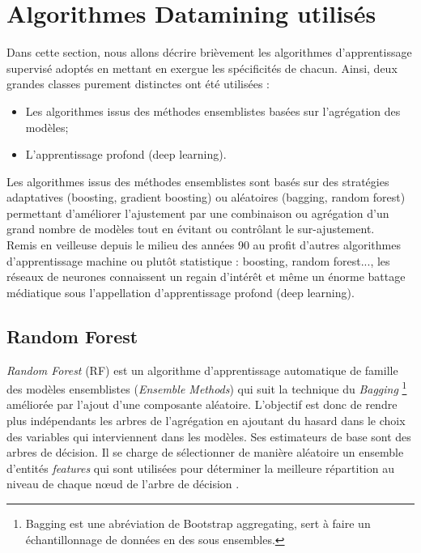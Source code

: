 \newpage
\section{Algorithmes Datamining utilisés}\label{algo_used}
Dans cette section, nous allons décrire brièvement les algorithmes d'apprentissage supervisé adoptés en mettant en exergue les spécificités de chacun. Ainsi, deux grandes classes purement distinctes ont été utilisées :
\begin{itemize}
    \item[\ding{224}] Les algorithmes issus des méthodes ensemblistes basées sur l'agrégation des modèles;
    \item[\ding{224}] L'apprentissage profond (deep learning).
\end{itemize}

Les algorithmes issus des méthodes ensemblistes sont basés sur des stratégies adaptatives (boosting, gradient boosting) ou aléatoires (bagging, random forest) permettant d’améliorer l’ajustement par une combinaison
ou agrégation d’un grand nombre de modèles tout en évitant ou contrôlant le sur-ajustement. \\

Remis en veilleuse depuis le milieu des années 90 au profit d’autres algorithmes  d’apprentissage  machine ou  plutôt  statistique : boosting,  random forest..., les réseaux de neurones connaissent un regain d’intérêt et même un énorme battage médiatique sous l’appellation d’apprentissage profond (deep learning). 

\subsection{Random Forest}
\textit{Random Forest} (RF) \citep{breiman2001random} est un algorithme d'apprentissage automatique de famille des modèles ensemblistes (\textit{Ensemble Methods}) qui suit la technique du \textit{Bagging} \footnote{Bagging est une abréviation de Bootstrap aggregating, sert à faire un échantillonnage de données en des sous ensembles.} \citep{breiman1996bagging} améliorée par l'ajout d'une composante aléatoire. L’objectif est donc de rendre plus indépendants les arbres de l’agrégation en ajoutant du hasard dans le choix des variables qui interviennent dans les modèles. Ses estimateurs de base sont des arbres de décision. Il se charge de sélectionner de manière aléatoire un ensemble d’entités \textit{features} qui sont utilisées pour déterminer la meilleure répartition au niveau de chaque nœud de l’arbre de décision \citep{wang2016estimation}.\\

